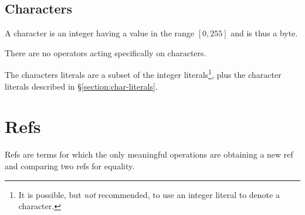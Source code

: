 \iffalse
\subsection{Bytes}

\index{byte!subset of integer|(}
A byte is an integer having a value in the range $[0,255]$.

There are no operators acting specifically on bytes.

There are no BIFs relating particularly to bytes, although various
BIFs expect arguments to be bytes or list of bytes, or return such values.

The byte literals are simply a subset of the integer literals
\ifOld
(but note that octal character escapes can be useful for denoting bytes).
\fi
{}
\fi

\ifOld
\subsection{Characters}

\label{section:chars}
A character is an integer having a value in the range $[0,255]$ and is
thus a byte.

There are no operators acting specifically on characters.

The characters literals are a subset of the integer
literals\footnote{It is possible, but \emph{not} recommended, to use
an integer literal to denote a character.}, plus the character
literals described in \S\ref{section:char-literals}.
\fi
{}

\section{Refs}

\label{section:refs}

Refs are terms for which the only meaningful operations are
obtaining a new ref and comparing two refs for equality.

